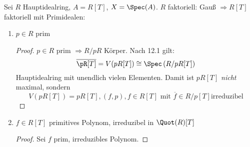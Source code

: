 \begin{example}
  Sei $R$ Hauptidealring, $A=R[T]$, $X=\Spec(A)$. $R$ faktoriell: Gauß
  $\Rightarrow R[T]$ faktoriell mit Primidealen:
  \begin{enumerate}
  \item $p\in R$ prim
    \begin{proof}
      $p\in R$ prim $\Rightarrow R/pR$ Körper. Nach 12.1 gilt:
      \[
        \overline{\pR[T]}=V(pR[T])\cong\Spec\left(R/pR[T]\right)
      \]
      Hauptidealring mit unendlich vielen Elementen. Damit ist $pR[T]$
      \emph{nicht} maximal, sondern
      \[ V(pR[T])={pR[T], (f,p), f\in R[T]
          \text{ mit } \overline{f}\in R/p[T]
        \text{irreduzibel}}
      \]
    \end{proof}
  \item $f\in R[T]$ primitives Polynom, irreduzibel in $\Quot(R)[T]$
    \begin{proof}
      Sei $f$ prim, irreduzibles Polynom.
    \end{proof}
  \end{enumerate}
\end{example}

